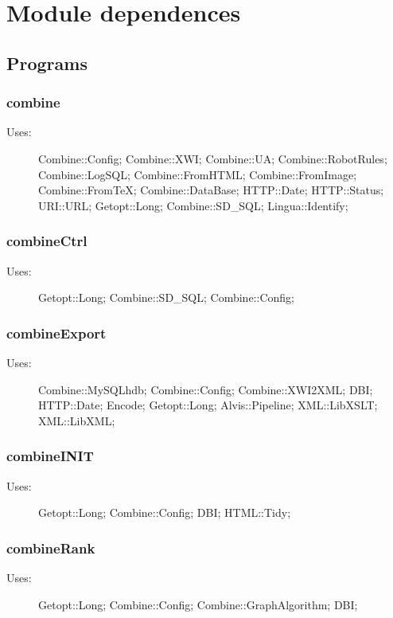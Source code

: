 
\section{Module dependences}
\label{moddep}
\subsection{Programs}
\subsubsection{combine}
\begin{description}
\item[Uses:] Combine::Config; Combine::XWI; Combine::UA; Combine::RobotRules; Combine::LogSQL; Combine::FromHTML; Combine::FromImage; Combine::FromTeX; Combine::DataBase; HTTP::Date; HTTP::Status; URI::URL; Getopt::Long; Combine::SD\_SQL; Lingua::Identify; 

\end{description}
\subsubsection{combineCtrl}
\begin{description}
\item[Uses:] Getopt::Long; Combine::SD\_SQL; Combine::Config; 

\end{description}
\subsubsection{combineExport}
\begin{description}
\item[Uses:] Combine::MySQLhdb; Combine::Config; Combine::XWI2XML; DBI; HTTP::Date; Encode; Getopt::Long; Alvis::Pipeline; XML::LibXSLT; XML::LibXML; 

\end{description}
\subsubsection{combineINIT}
\begin{description}
\item[Uses:] Getopt::Long; Combine::Config; DBI; HTML::Tidy; 

\end{description}
\subsubsection{combineRank}
\begin{description}
\item[Uses:] Getopt::Long; Combine::Config; Combine::GraphAlgorithm; DBI; 

\end{description}
